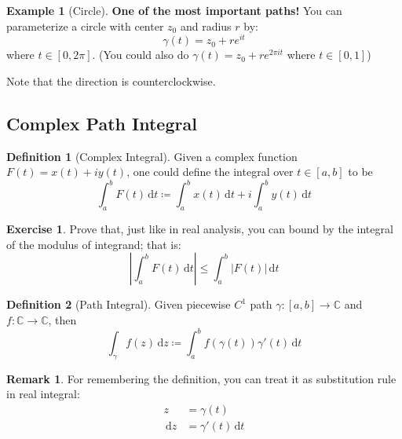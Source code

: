 \documentclass[a4paper, 12pt]{article}
\theoremstyle{definition}
\newtheorem{definition}{Definition}
\newtheorem{exercise}{Exercise}
\newtheorem{example}{Example}
\newtheorem{remark}{Remark}
\numberwithin{theorem}{section}
\numberwithin{definition}{section}
\numberwithin{exercise}{section}
\numberwithin{remark}{section}
\numberwithin{figure}{section}
\numberwithin{example}{section}
\newcommand{\C}{\mathbb{C}}
\newcommand{\intd}{\,\text{d}}
\begin{document}
\begin{example}[Circle]
    \textbf{One of the most important paths!}
    You can parameterize a circle with center $z_0$ and radius $r$ by:
    \begin{equation*}
        \gamma(t) = z_0 + r e^{it}
    \end{equation*}
    where $t \in \left[ 0, 2\pi \right]$.
    (You could also do $\gamma(t) = z_0 + r e^{2\pi i t}$ where $t \in \left[ 0, 1 \right]$)
    
    Note that the direction is counterclockwise.
\end{example}

\subsection{Complex Path Integral}
\begin{definition}[Complex Integral]
Given a complex function $F(t) = x (t) + i y(t)$,
one could define the integral over $t\in \left[ a,b \right]$ to be
\begin{equation*}
    \int_{a}^b F(t) \intd t \coloneqq \int_a^b x(t) \intd t + i \int_a^b y(t) \intd t
\end{equation*}
\end{definition}
\begin{exercise}
    Prove that, just like in real analysis, you can bound by the integral of the modulus of integrand; that is:
    \begin{equation*}
        \left| \int_a^b F(t) \intd t \right| \leq \int_a^b \left| F(t) \right| \intd t
    \end{equation*}
\end{exercise}
\begin{definition}[Path Integral]
    Given piecewise $C^1$ path $\gamma:[a,b] \rightarrow \C$ and $f: \C \rightarrow \C$, then
    \begin{equation*}
        \int_{\gamma} f(z) \intd z \coloneqq \int_{a}^b f\left( \gamma(t) \right) \gamma'(t) \intd t
    \end{equation*}
\end{definition}
\begin{remark}
    For remembering the definition,
    you can treat it as substitution rule in real integral:
    \begin{align*}
        z &= \gamma(t) \\
        \intd z &= \gamma'(t) \intd t
    \end{align*}
\end{remark}
\end{document}

